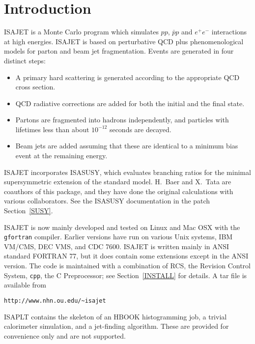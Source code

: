 \section{Introduction\label{INTRO}}

      ISAJET is a Monte Carlo program which simulates $pp$, 
$\bar pp$ and $e^+e^-$ interactions at high energies. 
ISAJET is based on
perturbative QCD plus phenomenological models for parton and beam jet
fragmentation. Events are generated in four distinct steps:
\begin{itemize}
\item A primary hard scattering is generated according to the
appropriate QCD cross section.
\item QCD radiative corrections are added for both the initial and the
final state.
\item Partons are fragmented into hadrons independently, and particles
with lifetimes less than about $10^{-12}$ seconds are decayed.
\item Beam jets are added assuming that these are identical to a
minimum bias event at the remaining energy.
\end{itemize}

      ISAJET incorporates ISASUSY, which evaluates branching ratios for
the minimal supersymmetric extension of the standard model. H.~Baer and
X.~Tata are coauthors of this package, and they have done the original
calculations with various collaborators. See the ISASUSY documentation
in the patch Section~\ref{SUSY}.

      ISAJET is now mainly developed and tested on Linux and Mac OSX
with the \verb|gfortran| compiler. Earlier versions have run on various
Unix systems, IBM VM/CMS, DEC VMS, and CDC 7600. ISAJET is written
mainly in ANSI standard FORTRAN 77, but it does contain some extensions
except in the ANSI version. The code is maintained with a combination of
RCS, the Revision Control System, \verb|cpp|, the C Preprocessor; see
Section~\ref{INSTALL} for details. A tar file is available from
\begin{verbatim}
http://www.nhn.ou.edu/~isajet
\end{verbatim}

      ISAPLT contains the skeleton of an HBOOK histogramming job, a
trivial calorimeter simulation, and a jet-finding algorithm. These are
provided for convenience only and are not supported.
